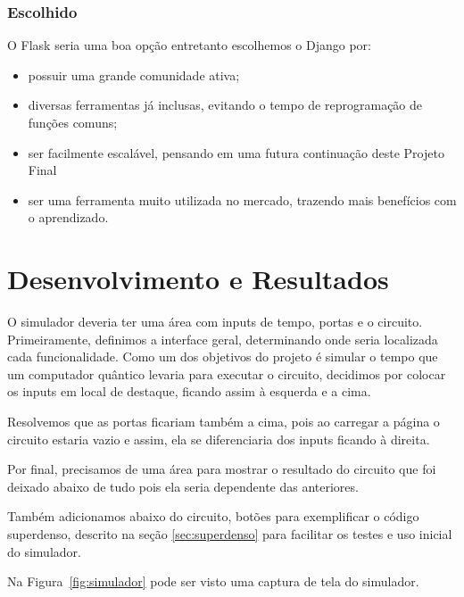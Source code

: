 \documentclass[a4paper, 12pt, oneside]{book}
\begin{document}
\subsection{Escolhido}
O Flask seria uma boa opção entretanto escolhemos o Django por:
\begin{itemize}
\item possuir uma grande comunidade ativa;
\item diversas ferramentas já inclusas, evitando o tempo de reprogramação de funções comuns;
\item ser facilmente escalável, pensando em uma futura continuação deste Projeto Final
\item ser uma ferramenta muito utilizada no mercado, trazendo mais benefícios com o aprendizado.
\end{itemize}


\chapter{Desenvolvimento e Resultados}
\thispagestyle{empty} 

O simulador deveria ter uma área com inputs de tempo, portas e o circuito. Primeiramente, definimos a interface geral, determinando onde seria localizada cada funcionalidade. Como um dos objetivos do projeto é simular o tempo que um computador quântico levaria para executar o circuito, decidimos por colocar os inputs em local de destaque, ficando assim à esquerda e a cima. 

Resolvemos que as portas ficariam também a cima, pois ao carregar a página o circuito estaria vazio e assim, ela se diferenciaria dos inputs ficando à direita.

Por final, precisamos de uma área para mostrar o resultado do circuito que foi deixado abaixo de tudo pois ela seria dependente das anteriores.

Também adicionamos abaixo do circuito, botões para exemplificar o código superdenso, descrito na seção \ref{sec:superdenso} para facilitar os testes e uso inicial do simulador.

Na Figura~\ref{fig:simulador} pode ser visto uma captura de tela do simulador.
\end{document}
